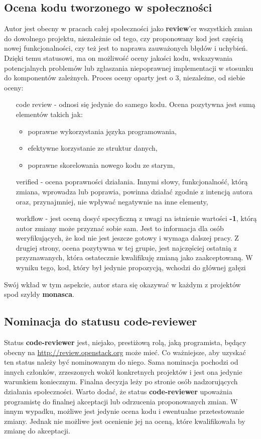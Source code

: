 \subsection{Ocena kodu tworzonego w społeczności}
Autor jest obecny w pracach całej społeczności jako \textbf{review}'er wszystkich zmian do dowolnego projektu, niezależnie od tego, czy 
proponowany kod jest częścią nowej funkcjonalności, czy też jest to naprawa zauważonych błędów i uchybień. Dzięki temu statusowi, ma on
możliwość oceny jakości kodu, wskazywania potencjalnych problemów lub zgłaszania niepoprawnej implementacji w stosunku do komponentów zależnych.
Proces oceny oparty jest o 3, niezależne, od siebie oceny:
\begin{itemize}
    \item[code review] - odnosi się jedynie do samego kodu. Ocena pozytywna jest sumą elementów takich jak:
    \begin{itemize}
        \item poprawne wykorzystania języka programowania,
        \item efektywne korzystanie ze struktur danych,
        \item poprawne skorelowania nowego kodu ze starym,
    \end{itemize}
    \item[verified] -  ocena poprawności działania. Innymi słowy, funkcjonalność, którą zmiana, wprowadza lub poprawia, powinna działać
    zgodnie z intencją autora oraz, przynajmniej, nie wpływać negatywnie na inne elementy,
    \item[workflow] - jest oceną dosyć specyficzną z uwagi na istnienie wartości \textbf{-1}, którą autor zmiany może przyznać sobie sam.
    Jest to informacja dla osób weryfikujących, że kod nie jest jeszcze gotowy i wymaga dalszej pracy. Z drugiej strony, ocena pozytywna w tej grupie,
    jest najczęściej ostatnią z przyznawanych, która ostatecznie kwalifikuję zmianą jako zaakceptowaną. W wyniku tego, kod, który był
    jedynie propozycją, wchodzi do głównej gałęzi
\end{itemize}
Swój wkład w tym aspekcie, autor stara się okazywać w każdym z projektów spod szyldy \textbf{monasca}.

\subsection{Nominacja do statusu code-reviewer}
Status \textbf{code-reviewer} jest, niejako, prestiżową rolą, jaką programista, będący obecny na \url{http://review.openstack.org} może mieć.
Co ważniejsze, aby uzyskać ten status należy być nominowanym do niego. Sama nominacja pochodzi od innych członków, zrzeszonych wokół
konkretnych projektów i jest ona jedynie warunkiem koniecznym. Finalna decyzja leży po stronie osób nadzorujących działania społeczności.
Warto dodać, że status \textbf{code-reviewer} upoważnia programistę do finalnej akceptacji lub odrzucenia proponowanych zmian. W innym wypadku,
możliwe jest jedynie ocena kodu i ewentualne przetestowanie zmiany. Jednak nie możliwe jest ocenienie jej na oceną, które kwalifikowała
by zmianę do akceptacji.
